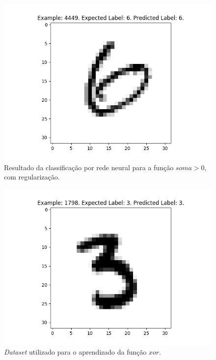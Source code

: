 \documentclass[conference]{IEEEtran}
\begin{document}
\begin{figure}[htbp]
\centering
\centerline{\includegraphics[scale=0.5]{imagens/test_image_4449.png}}
\caption{Resultado da classificação por rede neural para a função $soma > 0$, com regularização.}
\label{test_image_4449}
\end{figure}

\begin{figure}[htbp]
\centering
\centerline{\includegraphics[scale=0.5]{imagens/test_image_1798.png}}
\caption{\textit{Dataset} utilizado para o aprendizado da função $xor$.}
\label{test_image_1798}
\end{figure} 
\end{document}
